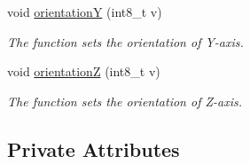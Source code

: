 \begin{DoxyCompactItemize}
void \hyperlink{class_c_n_c___router_abced37562004a4b303291be79e49a23b}{orientation\+Y} (int8\+\_\+t v)
\begin{DoxyCompactList}\small\item\em The function sets the orientation of Y-\/axis. \end{DoxyCompactList}\item 
void \hyperlink{class_c_n_c___router_a7dc30b35ae89245b4b8f53a0777472a5}{orientation\+Z} (int8\+\_\+t v)
\begin{DoxyCompactList}\small\item\em The function sets the orientation of Z-\/axis. \end{DoxyCompactList}\end{DoxyCompactItemize}
\subsection*{Private Attributes}
